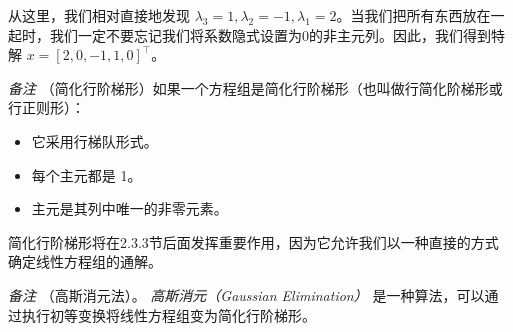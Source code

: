 从这里，我们相对直接地发现 $ {\lambda}_3 = 1, {\lambda}_2 = -1, {\lambda}_1 = 2 $。当我们把所有东西放在一起时，我们一定不要忘记我们将系数隐式设置为0的非主元列。因此，我们得到特解 $ x = [2, 0, −1, 1, 0]^{\top} $。

\emph{备注} （简化行阶梯形）如果一个方程组是简化行阶梯形（也叫做行简化阶梯形或行正则形）：

\begin{itemize}
\item 它采用行梯队形式。
\item 每个主元都是 1。
\item 主元是其列中唯一的非零元素。
\end{itemize}

简化行阶梯形将在2.3.3节后面发挥重要作用，因为它允许我们以一种直接的方式确定线性方程组的通解。

\emph{备注} （高斯消元法）。 \emph{高斯消元（Gaussian Elimination）} 是一种算法，可以通过执行初等变换将线性方程组变为简化行阶梯形。

